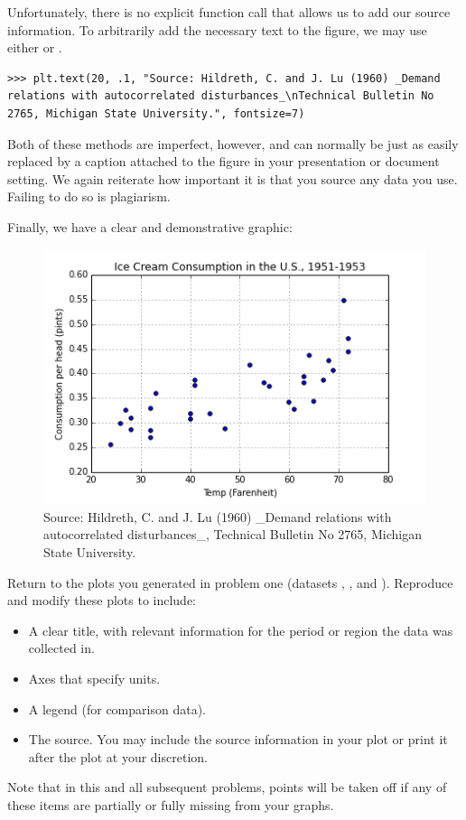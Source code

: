 Unfortunately, there is no explicit function call that allows us to add our source information.
To arbitrarily add the necessary text to the figure, we may use either  or . 
\begin{lstlisting}
>>> plt.text(20, .1, "Source: Hildreth, C. and J. Lu (1960) _Demand relations with autocorrelated disturbances_\nTechnical Bulletin No 2765, Michigan State University.", fontsize=7)
\end{lstlisting}
Both of these methods are imperfect, however, and can normally be just as easily replaced by a caption attached to the figure in your presentation or document setting. 
We again reiterate how important it is that you source any data you use. Failing to do so is plagiarism.

Finally, we have a clear and demonstrative graphic:

\begin{figure}[H] 
    \centering
    \includegraphics[width=.75\textwidth]{Icecream.png}
    \caption{Source:  Hildreth, C. and J. Lu (1960) \_Demand relations with autocorrelated disturbances\_, Technical Bulletin No 2765, Michigan State University.}
    \label{fig:aplot}
\end{figure}

\begin{problem}
Return to the plots you generated in problem one (datasets , , and ).
Reproduce and modify these plots to include:
\begin{itemize}
\item A clear title, with relevant information for the period or region the data was collected in.
\item Axes that specify units.
\item A legend (for comparison data).
\item The source. You may include the source information in your plot or print it after the plot at your discretion.
\end{itemize}
Note that in this and all subsequent problems, points will be taken off if any of these items are partially or fully missing from your graphs.
\end{problem}

